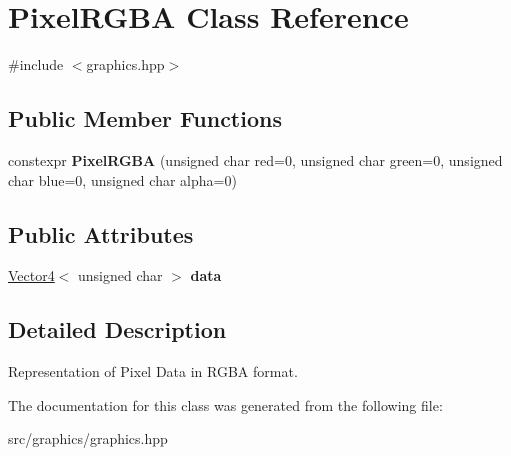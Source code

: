 \hypertarget{class_pixel_r_g_b_a}{}\section{Pixel\+R\+G\+BA Class Reference}
\label{class_pixel_r_g_b_a}


{\ttfamily \#include $<$graphics.\+hpp$>$}

\subsection*{Public Member Functions}
\begin{DoxyCompactItemize}
\item 
\mbox{\label{class_pixel_r_g_b_a_a69b64de852cd399a459b6924e8b3c440}} 
constexpr {\bfseries Pixel\+R\+G\+BA} (unsigned char red=0, unsigned char green=0, unsigned char blue=0, unsigned char alpha=0)
\end{DoxyCompactItemize}
\subsection*{Public Attributes}
\begin{DoxyCompactItemize}
\item 
\mbox{\label{class_pixel_r_g_b_a_a0a7a223782f5d198363f7ebcf83f4280}} 
\mbox{\hyperlink{class_vector4}{Vector4}}$<$ unsigned char $>$ {\bfseries data}
\end{DoxyCompactItemize}


\subsection{Detailed Description}
Representation of Pixel Data in R\+G\+BA format. 

The documentation for this class was generated from the following file\+:\begin{DoxyCompactItemize}
\item 
src/graphics/graphics.\+hpp\end{DoxyCompactItemize}
